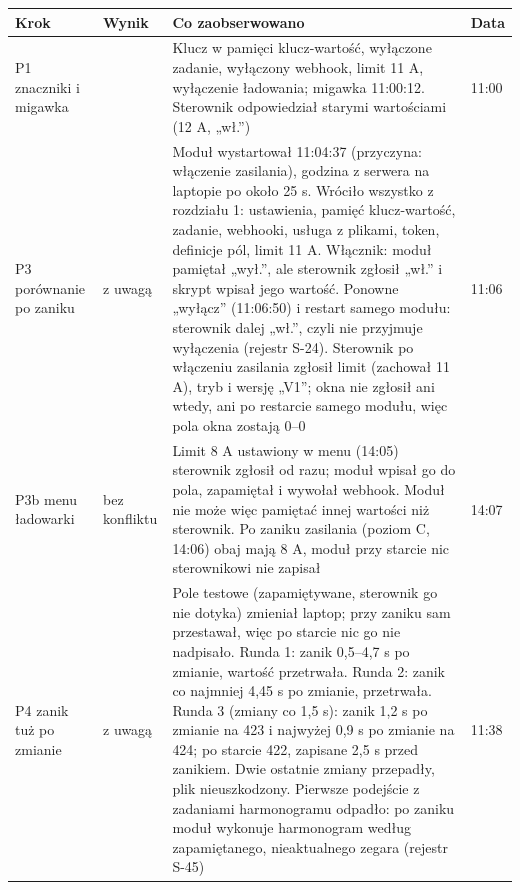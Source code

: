 \documentclass[11pt,a4paper]{article}
\begin{document}
\begin{longtable}{>{\raggedright\arraybackslash}p{3.01cm}>{\raggedright\arraybackslash}p{1.82cm}>{\raggedright\arraybackslash}p{8.56cm}>{\raggedright\arraybackslash}p{1.44cm}}
\toprule
\rowcolor{apteallight}\textbf{Krok} & \textbf{Wynik} & \textbf{Co zaobserwowano} & \textbf{Data} \\
\midrule\endhead
\bottomrule\endfoot
P1 znaczniki i migawka & \leavevmode{\symbolfont\color{apgreen}\textbf{✔}} & Klucz w pamięci klucz-wartość, wyłączone zadanie, wyłączony webhook, limit 11 A, wyłączenie ładowania; migawka 11:00:12. Sterownik odpowiedział starymi wartościami (12 A, „wł.”) & 30.09 11:00 \\
P3 porównanie po zaniku & \leavevmode{\symbolfont\color{apgreen}\textbf{✔}} z uwagą & Moduł wystartował 11:04:37 (przyczyna: włączenie zasilania), godzina z serwera na laptopie po około 25 s. Wróciło wszystko z rozdziału 1: ustawienia, pamięć klucz-wartość, zadanie, webhooki, usługa z plikami, token, definicje pól, limit 11 A. Włącznik: moduł pamiętał „wył.”, ale sterownik zgłosił „wł.” i skrypt wpisał jego wartość. Ponowne „wyłącz” (11:06:50) i restart samego modułu: sterownik dalej „wł.”, czyli nie przyjmuje wyłączenia (rejestr S-24). Sterownik po włączeniu zasilania zgłosił limit (zachował 11 A), tryb i wersję „V1”; okna nie zgłosił ani wtedy, ani po restarcie samego modułu, więc pola okna zostają 0–0 & 30.09 11:06 \\
P3b menu ładowarki & \leavevmode{\symbolfont\color{apgreen}\textbf{✔}} bez konfliktu & Limit 8 A ustawiony w menu (14:05) sterownik zgłosił od razu; moduł wpisał go do pola, zapamiętał i wywołał webhook. Moduł nie może więc pamiętać innej wartości niż sterownik. Po zaniku zasilania (poziom C, 14:06) obaj mają 8 A, moduł przy starcie nic sterownikowi nie zapisał & 30.09 14:07 \\
P4 zanik tuż po zmianie & \leavevmode{\symbolfont\color{apgreen}\textbf{✔}} z uwagą & Pole testowe (zapamiętywane, sterownik go nie dotyka) zmieniał laptop; przy zaniku sam przestawał, więc po starcie nic go nie nadpisało. Runda 1: zanik 0,5–4,7 s po zmianie, wartość przetrwała. Runda 2: zanik co najmniej 4,45 s po zmianie, przetrwała. Runda 3 (zmiany co 1,5 s): zanik 1,2 s po zmianie na 423 i najwyżej 0,9 s po zmianie na 424; po starcie 422, zapisane 2,5 s przed zanikiem. Dwie ostatnie zmiany przepadły, plik nieuszkodzony. Pierwsze podejście z zadaniami harmonogramu odpadło: po zaniku moduł wykonuje harmonogram według zapamiętanego, nieaktualnego zegara (rejestr S-45) & 30.09 11:38 \\

\end{longtable}
\end{document}
